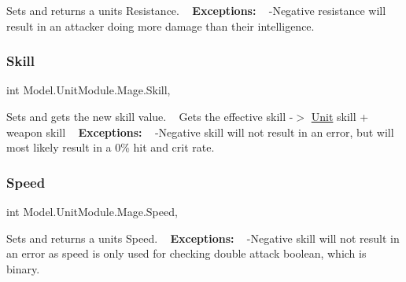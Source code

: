 Sets and returns a unit\textquotesingle{}s Resistance. ~\newline
 {\bfseries Exceptions\+:} ~\newline
 -\/\+Negative resistance will result in an attacker doing more damage than their intelligence. \hypertarget{class_model_1_1_unit_module_1_1_mage_af61303ab529c005f4fed6707672a905e}{}\label{class_model_1_1_unit_module_1_1_mage_af61303ab529c005f4fed6707672a905e} 
\subsubsection{\texorpdfstring{Skill}{Skill}}
{\footnotesize\ttfamily int Model.\+Unit\+Module.\+Mage.\+Skill\hspace{0.3cm}{\ttfamily [get]}, {\ttfamily [set]}}

Sets and gets the new skill value. ~\newline
 Gets the effective skill -\/$>$ \hyperlink{interface_model_1_1_unit_module_1_1_unit}{Unit} skill + weapon skill ~\newline
 {\bfseries Exceptions\+:} ~\newline
 -\/\+Negative skill will not result in an error, but will most likely result in a 0\% hit and crit rate. \hypertarget{class_model_1_1_unit_module_1_1_mage_af6c66da17b184fbe0fd15ca059cadde3}{}\label{class_model_1_1_unit_module_1_1_mage_af6c66da17b184fbe0fd15ca059cadde3} 
\subsubsection{\texorpdfstring{Speed}{Speed}}
{\footnotesize\ttfamily int Model.\+Unit\+Module.\+Mage.\+Speed\hspace{0.3cm}{\ttfamily [get]}, {\ttfamily [set]}}

Sets and returns a unit\textquotesingle{}s Speed. ~\newline
 {\bfseries Exceptions\+:} ~\newline
 -\/\+Negative skill will not result in an error as speed is only used for checking double attack boolean, which is binary. \hypertarget{class_model_1_1_unit_module_1_1_mage_a20fd3a8868f4c19b8b3e0373c1133446}{}\label{class_model_1_1_unit_module_1_1_mage_a20fd3a8868f4c19b8b3e0373c1133446} 
